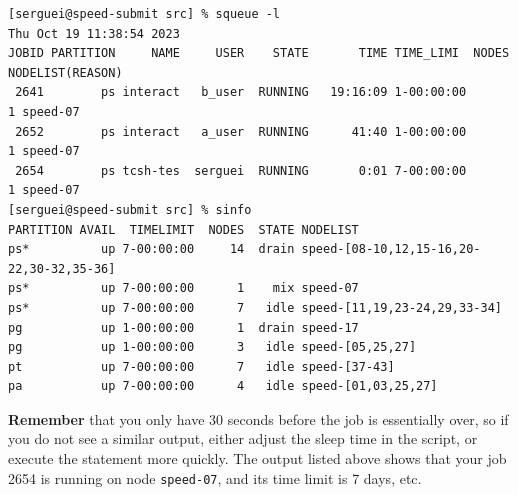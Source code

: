 
\small
\begin{verbatim}
[serguei@speed-submit src] % squeue -l
Thu Oct 19 11:38:54 2023
JOBID PARTITION     NAME     USER    STATE       TIME TIME_LIMI  NODES NODELIST(REASON)
 2641        ps interact   b_user  RUNNING   19:16:09 1-00:00:00      1 speed-07
 2652        ps interact   a_user  RUNNING      41:40 1-00:00:00      1 speed-07
 2654        ps tcsh-tes  serguei  RUNNING       0:01 7-00:00:00      1 speed-07
[serguei@speed-submit src] % sinfo
PARTITION AVAIL  TIMELIMIT  NODES  STATE NODELIST
ps*          up 7-00:00:00     14  drain speed-[08-10,12,15-16,20-22,30-32,35-36]
ps*          up 7-00:00:00      1    mix speed-07
ps*          up 7-00:00:00      7   idle speed-[11,19,23-24,29,33-34]
pg           up 1-00:00:00      1  drain speed-17
pg           up 1-00:00:00      3   idle speed-[05,25,27]
pt           up 7-00:00:00      7   idle speed-[37-43]
pa           up 7-00:00:00      4   idle speed-[01,03,25,27]
\end{verbatim}
\normalsize

\noindent \textbf{Remember} that you only have 30 seconds before the job is essentially over, so 
if you do not see a similar output, either adjust the sleep time in the 
script, or execute the  statement more quickly. The  
output listed above shows that your job 2654 is running on node \texttt{speed-07}, 
and its time limit is 7 days, etc.\\

